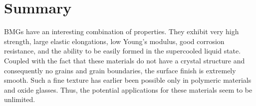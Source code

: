 \chapter{Summary}

BMGs have an interesting combination of properties. They exhibit very high strength, large elastic elongations, low Young’s modulus, good corrosion resistance, and the ability to be easily formed in the supercooled liquid state. Coupled with the fact that these materials do not have a crystal structure and consequently no grains and grain boundaries, the surface finish is extremely smooth. Such a fine texture has earlier been possible only in polymeric materials and oxide glasses. Thus, the potential applications for these materials seem to be unlimited.

